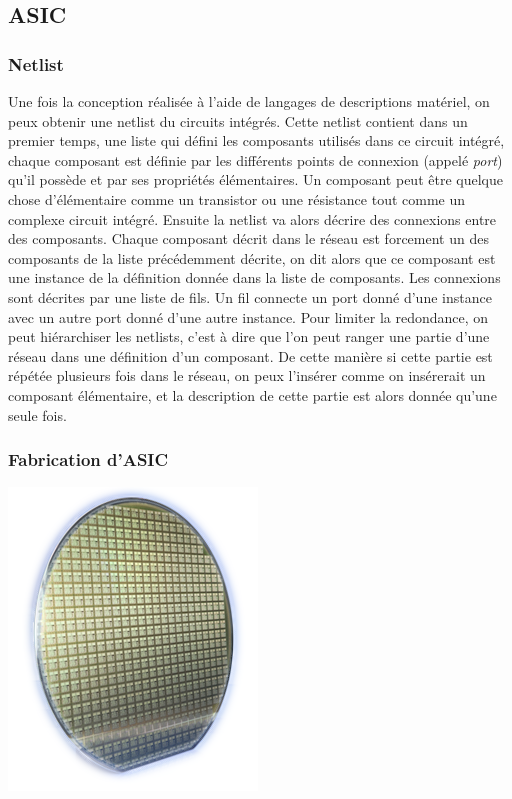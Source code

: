 \subsection{ASIC}

\subsubsection{Netlist} Une fois la conception réalisée à l'aide de langages de
descriptions matériel, on peux obtenir une netlist du circuits intégrés. Cette
netlist contient dans un premier temps, une liste qui défini les composants utilisés
dans ce circuit intégré, chaque composant est définie par les différents points de
connexion (appelé \textit{port}) qu'il possède et par ses propriétés élémentaires. Un
composant peut être quelque chose d'élémentaire comme un transistor ou une résistance
tout comme un complexe circuit intégré. Ensuite la netlist va alors décrire des
connexions entre des composants. Chaque composant décrit dans le réseau est forcement
un des composants de la liste précédemment décrite, on dit alors que ce composant est
une instance de la définition donnée dans la liste de composants. Les connexions sont
décrites par une liste de fils. Un fil connecte un port donné d'une instance avec un
autre port donné d'une autre instance. Pour limiter la redondance, on peut
hiérarchiser les netlists, c'est à dire que l'on peut ranger une partie d'une réseau
dans une définition d'un composant. De cette manière si cette partie est répétée
plusieurs fois dans le réseau, on peux l'insérer comme on insérerait un composant
élémentaire, et la description de cette partie est alors donnée qu'une seule fois.

\subsubsection{Fabrication d'ASIC}


\includegraphics{asic.png}

